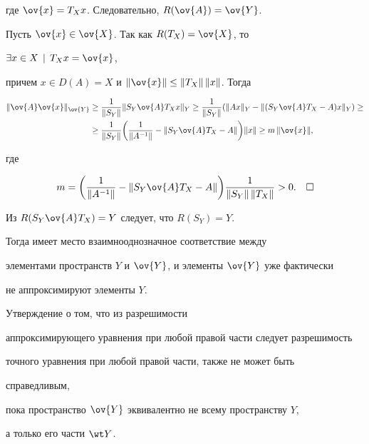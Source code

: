 где $\ov{x} = T_Xx$. Следовательно, $R(\ov{A})=\ov{Y}$.





Пусть $\ov{x}\in\ov{X}$. Так как $R(T_X)=\ov{X}$, то


$\exists x\in X \,\mid\, T_Xx=\ov{x}$,


причем $x\in D(A)=X$ и $\nr{\ov{x}}\le\nr{T_X}\,\nr{x}$. Тогда


\begin{align*}


\nr{\ov{A}\ov{x}}_{\ov{Y}} &\ge \frac{1}{\nr{S_Y}}\nr{S_Y\ov{A} T_Xx}_Y


\ge \frac{1}{\nr{S_Y}}


( \nr{Ax}_Y-\nr{(S_Y\ov{A} T_X - A)x}_Y ) \ge \\


%


&\ge \frac{1}{\nr{S_Y}} \bigg( \frac{1}{\nr{A^{-1}}}


 -\nr{S_Y\ov{A} T_X - A} \bigg) \nr{x} \ge m\,\nr{\ov{x}},


\end{align*}


где


$$


m = \bigg( \frac{1}{\nr{A^{-1}}} -\nr{S_Y\ov{A} T_X - A}


\bigg)\frac{1}{\nr{S_Y}\,\nr{T_X}} > 0.\quad\square


$$


\setcounter{note}{0}





\begin{note} Из $R(S_Y\ov{A} T_X)=Y$ следует, что $R(S_Y)=Y$.


Тогда имеет место взаимнооднозначное соответствие между


элементами пространств $Y$ и $\ov{Y}$, и элементы $\ov{Y}$ уже фактически


не аппроксимируют элементы $Y$.


\end{note}





\begin{note} Утверждение о том, что из разрешимости


аппроксимирующего уравнения при любой правой части следует разрешимость


точного уравнения при любой правой части, также не может быть


справедливым,


пока пространство $\ov{Y}$ эквивалентно не всему пространству $Y$,


а только его части $\wt Y$.


\end{note}





